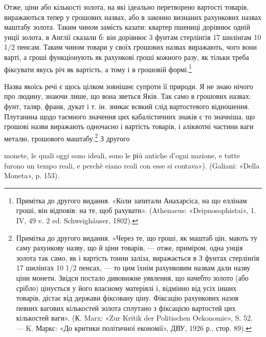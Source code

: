 Отже, ціни або кількості золота, на які ідеально перетворено
вартості товарів, виражаються тепер у грошових назвах, або в
законно визнаних рахункових назвах маштабу золота. Таким
чином замість казати: квартер пшениці дорівнює одній унції
золота, в Англії сказали б: він дорівнює 3 фунтам стерлінґів
17 шилінґам 10 1/2 пенсам. Таким чином товари у своїх грошових
назвах виражають, чого вони варті, а гроші функціонують як
рахункові гроші кожного разу, як тільки треба фіксувати якусь
річ як вартість, а тому і в грошовій формі.\footnote{
Примітка до другого видання. «Коли запитали Анахарсіса, на що
еллінам гроші, він відповів: на те, щоб рахувати». (Athenaeus: «Deipnosophistai»,
1. IV, 49 v. 2 ed. Schweighäuser, 1802).
}

Назва якоїсь речі є щось цілком зовнішнє супроти її природи.
Я не знаю нічого про людину, знаючи лише, що вона зветься
Яків. Так само в грошових назвах: фунт, таляр, франк, дукат
і т. ін. зникає всякий слід вартостевого відношення. Плутанина
щодо таємного значення цих кабалістичних знаків є то значніша,
що грошові назви виражають одночасно і вартість товарів,
і аліквотні частини ваги металю, грошового маштабу.\footnote{
Примітка до другого видання. «Через те, що гроші, як маштаб цін,
мають ту саму рахункову назву, що й ціни товарів, — отже, приміром,
одна унція золота так само, як і вартість тонни заліза, виражається в
З фунтах стерлінґів 17 шилінґах 10 1/2 пенсах, — то цим їхнім рахунковим
назвам дали назву ціни монети. Звідси постало дивовижне уявлення, що
начебто золото (або срібло) цінується у його власному матеріялі і, відмінно
від усіх інших товарів, дістає від держави фіксовану ціну. Фіксацію
рахункових назов певних вагових кількостей золота сплутано з
фіксацією вартостей цих кількостей ваги». (К. Marx: «Zur Kritik der
Politischen Oekonomie», S. 52. — K. Маркс: «До критики політичної
економії», ДВУ, 1926 р., стор. 89).
} З другого

monete, le quali oggi sono ideali, sono le ріù antiche d’ogni nazione, e tutte
furono un tempo reali, e perchè eiano reali con esse si contava»). (Galiani:
«Della Moneta», p. 153).
\parbreak{}  %
